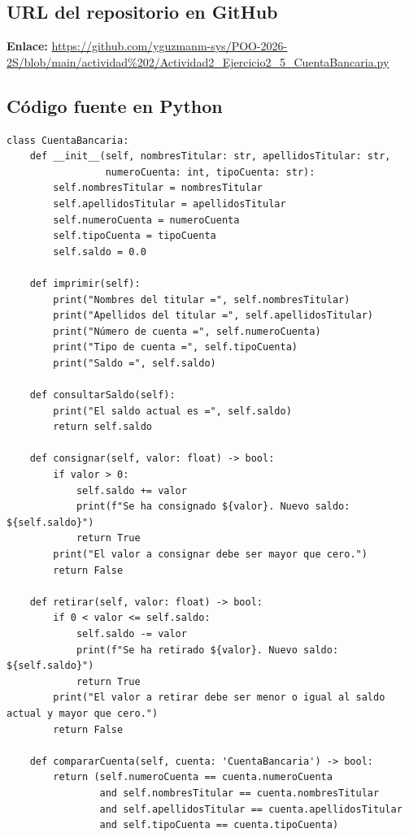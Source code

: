 \documentclass[11pt,a4paper]{article}
\begin{document}
\subsection{URL del repositorio en GitHub}
\noindent \textbf{Enlace:} \url{https://github.com/yguzmanm-sys/POO-2026-2S/blob/main/actividad%202/Actividad2_Ejercicio2_5_CuentaBancaria.py}

\subsection{Código fuente en Python}
\begin{lstlisting}[caption={Implementación de la clase CuentaBancaria (\texttt{Actividad2\_Ejercicio2\_5\_CuentaBancaria.py})}]
class CuentaBancaria:
    def __init__(self, nombresTitular: str, apellidosTitular: str,
                 numeroCuenta: int, tipoCuenta: str):
        self.nombresTitular = nombresTitular
        self.apellidosTitular = apellidosTitular
        self.numeroCuenta = numeroCuenta
        self.tipoCuenta = tipoCuenta
        self.saldo = 0.0

    def imprimir(self):
        print("Nombres del titular =", self.nombresTitular)
        print("Apellidos del titular =", self.apellidosTitular)
        print("Número de cuenta =", self.numeroCuenta)
        print("Tipo de cuenta =", self.tipoCuenta)
        print("Saldo =", self.saldo)

    def consultarSaldo(self):
        print("El saldo actual es =", self.saldo)
        return self.saldo

    def consignar(self, valor: float) -> bool:
        if valor > 0:
            self.saldo += valor
            print(f"Se ha consignado ${valor}. Nuevo saldo: ${self.saldo}")
            return True
        print("El valor a consignar debe ser mayor que cero.")
        return False

    def retirar(self, valor: float) -> bool:
        if 0 < valor <= self.saldo:
            self.saldo -= valor
            print(f"Se ha retirado ${valor}. Nuevo saldo: ${self.saldo}")
            return True
        print("El valor a retirar debe ser menor o igual al saldo actual y mayor que cero.")
        return False

    def compararCuenta(self, cuenta: 'CuentaBancaria') -> bool:
        return (self.numeroCuenta == cuenta.numeroCuenta
                and self.nombresTitular == cuenta.nombresTitular
                and self.apellidosTitular == cuenta.apellidosTitular
                and self.tipoCuenta == cuenta.tipoCuenta)


\end{lstlisting}
\end{document}
